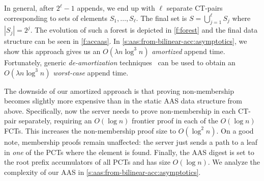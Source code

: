In general, after $2^\ell - 1$ appends, we end up with $\ell$ separate CT-pairs corresponding to sets of elements $S_1,\dots,S_\ell$.
The final set is $S=\bigcup_{j=1}^{\ell} S_j$ where $|S_j| = 2^j$.
The evolution of such a forest is depicted in \cref{f:forest} and the final data structure can be seen in \cref{f:accaas}.
In \cref{s:aas:from-bilinear-acc:asymptotics}, we show this approach gives us an $O(\lambda n\log^3 {n})$  \textit{amortized} append time.
Fortunately, generic \textit{de-amortization} techniques~\cite{overmars,overmars-van-leeuwen} can be used to obtain an $O(\lambda n\log^3 {n})$ \textit{worst-case} append time.

\amortizedAasFig

The downside of our amortized approach is that proving non-membership becomes slightly more expensive than in the static AAS data structure from above.
Specifically, now the server needs to prove non-membership in each CT-pair separately, requiring an $O(\log{n})$ frontier proof in each of the $O(\log{n})$ FCTs.
This increases the non-membership proof size to $O(\log^2 n)$.
On a good note, membership proofs remain unaffected: the server just sends a path to a leaf in \textit{one} of the PCTs where the element is found.
Finally, the AAS digest is set to the root prefix accumulators of all PCTs and has size $O(\log{n})$.
We analyze the complexity of our AAS in \cref{s:aas:from-bilinear-acc:asymptotics}.


